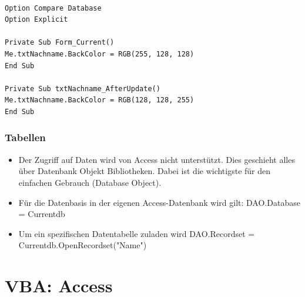 \begin{lstlisting}[style=VBA]

Option Compare Database
Option Explicit

Private Sub Form_Current()
Me.txtNachname.BackColor = RGB(255, 128, 128)
End Sub

Private Sub txtNachname_AfterUpdate()
Me.txtNachname.BackColor = RGB(128, 128, 255)
End Sub

\end{lstlisting} 
\subsubsection{Tabellen}
\begin{itemize}
\item Der Zugriff auf Daten wird von Access nicht unterstützt. Dies geschieht alles über Datenbank Objekt Bibliotheken. Dabei ist die wichtigste für den einfachen Gebrauch  (Database Object).
\item Für die Datenbasis in der eigenen Access-Datenbank wird gilt: DAO.Database = Currentdb
\item Um ein spezifischen Datentabelle zuladen wird DAO.Recordset = Currentdb.OpenRecordset("Name")
\end{itemize}  


\pagebreak
\section{VBA: Access}

